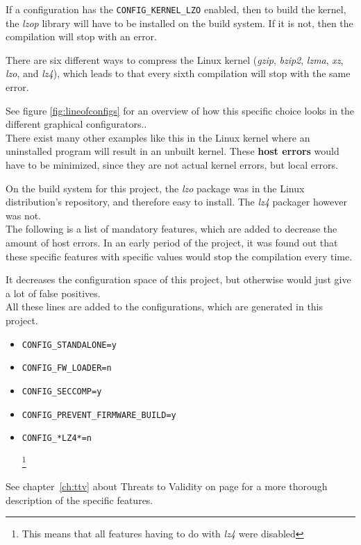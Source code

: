 \documentclass[a4paper,11pt]{report}
\newcommand{\textcode}[1]{
    \fboxsep=1pt
    \texttt{\colorbox{gray!20}{#1}}
}
\begin{document}
If a configuration has the \textcode{CONFIG\_KERNEL\_LZO} enabled, then to 
build the kernel, the \emph{lzop} library will have to be installed on the 
build system. If it is not, then the compilation will stop with an error.

There are six different ways to compress the Linux kernel (\emph{gzip}, 
\emph{bzip2}, \emph{lzma}, \emph{xz}, \emph{lzo}, and \emph{lz4}),
which leads to that every sixth compilation will stop with the same error.

See figure \ref{fig:lineofconfigs} for an overview of how this specific choice
looks in the different graphical configurators..
\\

There exist many other examples like this in the Linux kernel where an 
uninstalled program will result in an unbuilt kernel. These \textbf{host 
errors} would have to be minimized, since they are not actual kernel errors, 
but local errors. 

On the build system for this project, the \emph{lzo} package was in the Linux 
distribution's repository, and therefore easy to install. The \emph{lz4} 
packager however was not.
\\

The following is a list of mandatory features, which are added to decrease the 
amount of host errors. In an early period of the project, it was found out that 
these specific features with specific values would stop the compilation every 
time.

It decreases the configuration space of this project, but otherwise 
would just give a lot of false positives.
\\

All these lines are added to the configurations, which are generated in
this project.

\begin{itemize}
    \item \textcode{CONFIG\_STANDALONE=y}
    \item \textcode{CONFIG\_FW\_LOADER=n}
    \item \textcode{CONFIG\_SECCOMP=y}
    \item \textcode{CONFIG\_PREVENT\_FIRMWARE\_BUILD=y}
    \item \textcode{CONFIG\_*LZ4*=n}
        \footnote{This means that all features having to do with \emph{lz4} 
                    were disabled}
\end{itemize}

See chapter~\ref{ch:ttv} about Threats to Validity on page \pageref{ch:ttv} 
for a more thorough description of the specific features.
\end{document}
